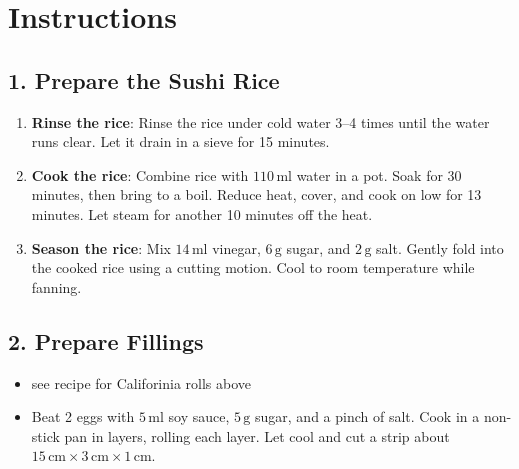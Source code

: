 \documentclass[landscape, a4paper]{article}
\newcommand\alert[1]{\textcolor{PrimaryColor}{\textbf{#1}}}
\begin{document}
\hfill%
\vrule width 0.01cm
\hfill%
\begin{minipage}[t]{0.31\textwidth}
	\vspace{0.5cm}
	\setlength{\parskip}{0.25cm}

	\section*{Instructions}
	\vspace{0.25cm}

	\subsection*{1. Prepare the Sushi Rice}
	\vspace{0.25cm}
	\begin{enumerate}
		\item \alert{Rinse the rice}: Rinse the rice under cold water 3--4 times until the water runs clear. Let it drain in a sieve for 15 minutes.
		\item \alert{Cook the rice}: Combine rice with \(110\,\mathrm{ml}\) water in a pot. Soak for 30 minutes, then bring to a boil. Reduce heat, cover, and cook on low for 13 minutes. Let steam for another 10 minutes off the heat.
		\item \alert{Season the rice}: Mix \(14\,\mathrm{ml}\) vinegar, \(6\,\mathrm{g}\) sugar, and \(2\,\mathrm{g}\) salt. Gently fold into the cooked rice using a cutting motion. Cool to room temperature while fanning.
	\end{enumerate}

	\subsection*{2. Prepare Fillings}
	\begin{itemize}
		\item see recipe for Califorinia rolls above
		\item Beat 2 eggs with \(5\,\mathrm{ml}\) soy sauce, \(5\,\mathrm{g}\) sugar, and a pinch of salt. Cook in a non-stick pan in layers, rolling each layer. Let cool and cut a strip about \(15\,\mathrm{cm} \times 3\,\mathrm{cm} \times 1\,\mathrm{cm}\).


\end{itemize}
\end{minipage}
\end{document}
